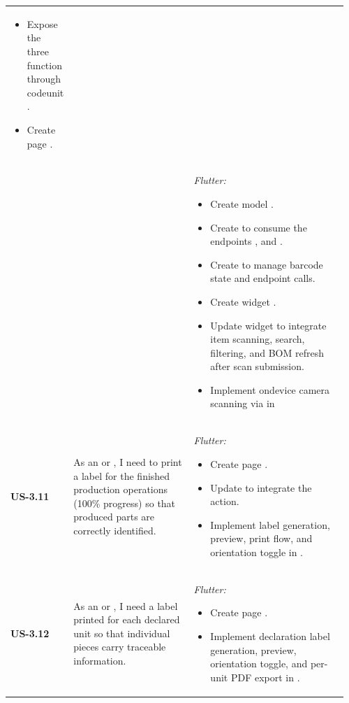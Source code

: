 \begin{longtable}{@{} P{0.09\linewidth} P{0.38\linewidth} P{0.49\linewidth} @{}}
\begin{itemize}[nosep, leftmargin=*]
		\item Expose the three function through codeunit .
		\item Create page .
	\end{itemize}
\\ & &
	\noindent\textit{Flutter:}
	\begin{itemize}[nosep, leftmargin=*]
		\item Create model .
		\item Create  to consume the endpoints , and .
		\item Create  to manage barcode state and endpoint calls.
		\item Create widget .
		\item Update widget  to integrate item scanning, search, filtering, and BOM refresh after scan submission.
		\item Implement on\-device camera scanning via  in 
	\end{itemize}\\
	\midrule
	\textbf{US-3.11}
	& As an  or , I need to print a label
	for the finished production operations (100\% progress) so that produced parts are correctly identified.
	& \noindent\textit{Flutter:}
	\begin{itemize}[nosep, leftmargin=*]
		\item Create page .
		\item Update  to integrate the  action.
		\item Implement label generation, preview, print flow, and orientation toggle in .
	\end{itemize} \\
	\midrule
	\textbf{US-3.12}
	& As an  or , I need a label printed
	for each declared unit so that individual pieces carry traceable information.
	& \noindent\textit{Flutter:}
	\begin{itemize}[nosep, leftmargin=*]
		\item Create page .
		\item Implement declaration label generation, preview, orientation toggle, and per-unit PDF export in .
	\end{itemize} \\
\end{longtable}


